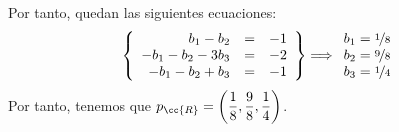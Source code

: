 \begin{ejercicio}
    Por tanto, quedan las siguientes ecuaciones:
    \begin{equation*}
        \left\{
        \begin{array}{rcl}
            b_1-b_2 &=& -1  \\
            -b_1-b_2-3b_3 &=& -2 \\
            -b_1-b_2+b_3 &=& -1
        \end{array}
        \right\} \Longrightarrow \begin{array}{rcl}
            b_1=\nicefrac{1}{8}  \\
            b_2 = \nicefrac{9}{8} \\
            b_3= \nicefrac{1}{4}
        \end{array}
    \end{equation*}
    Por tanto, tenemos que $p_{\cc{R}}=\displaystyle \left(\frac{1}{8},\frac{9}{8},\frac{1}{4}\right)$.
\end{ejercicio}

